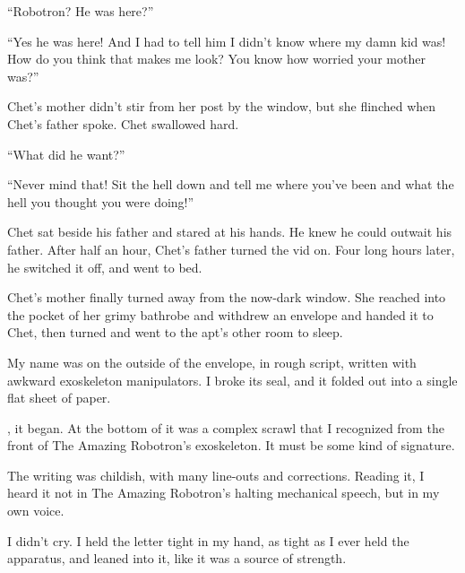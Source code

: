 ``Robotron? He was here?''

``Yes he was here! And I had to tell him I didn't know where my damn kid was! 
How do you think that makes me look? You know how worried your mother was?''

Chet's mother didn't stir from her post by the window, but she
flinched when Chet's father spoke. Chet swallowed hard.

``What did he want?''

``Never mind that! Sit the hell down and tell me where you've been and what the 
hell you thought you were doing!''

Chet sat beside his father and stared at his hands. He knew he
could outwait his father. After half an hour, Chet's father turned
the vid on. Four long hours later, he switched it off, and went to
bed.

Chet's mother finally turned away from the now-dark window. She
reached into the pocket of her grimy bathrobe and withdrew an
envelope and handed it to Chet, then turned and went to the apt's
other room to sleep.

My name was on the outside of the envelope, in rough script,
written with awkward exoskeleton manipulators. I broke its seal,
and it folded out into a single flat sheet of paper.

, it began. At the bottom of it was a complex scrawl that
I recognized from the front of The Amazing Robotron's exoskeleton.
It must be some kind of signature.


The writing was childish, with many line-outs and corrections.
Reading it, I heard it not in The Amazing Robotron's halting
mechanical speech, but in my own voice.

I didn't cry. I held the letter tight in my hand, as tight as I
ever held the apparatus, and leaned into it, like it was a source
of strength.

